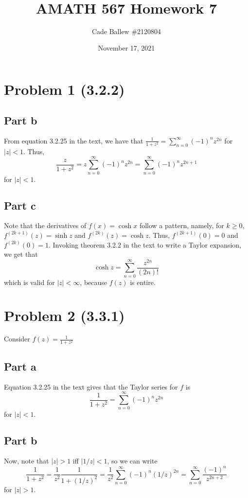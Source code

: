 \documentclass{article}
\title{AMATH 567 Homework 7}
\author{Cade Ballew \#2120804}
\date{November 17, 2021}
\begin{document}
\maketitle

\section{Problem 1 (3.2.2)}

\subsection{Part b}
From equation 3.2.25 in the text, we have that $\frac{1}{1+z^2}=\sum_{n=0}^\infty(-1)^nz^{2n}$ for $|z|<1$. Thus, 
\[
\frac{z}{1+z^2}=z\sum_{n=0}^\infty(-1)^nz^{2n}=\sum_{n=0}^\infty(-1)^nz^{2n+1}
\]
for $|z|<1$.

\subsection{Part c}
Note that the derivatives of $f(x)=\cosh{x}$ follow a pattern, namely, for $k\geq0$, $f^{(2k+1)}(z)=\sinh{z}$ and  $f^{(2k)}(z)=\cosh{z}$. Thus, $f^{(2k+1)}(0)=0$ and $f^{(2k)}(0)=1$. Invoking theorem 3.2.2 in the text to write a Taylor expansion, we get that 
\[
\cosh{z}=\sum_{n=0}^\infty\frac{z^{2n}}{(2n)!}
\]
which is valid for $|z|<\infty$, because $f(z)$ is entire.


\section{Problem 2 (3.3.1)} 
Consider $f(z)=\frac{1}{1+z^2}$
\subsection{Part a}
Equation 3.2.25 in the text gives that the Taylor series for $f$ is 
\[
\frac{1}{1+z^2}=\sum_{n=0}^\infty(-1)^nz^{2n}
\]
for $|z|<1$.

\subsection{Part b}
Now, note that $|z|>1$ iff $|1/z|<1$, so we can write 
\[
\frac{1}{1+z^2}=\frac{1}{z^2}\frac{1}{1+(1/z)^2}=\frac{1}{z^2}\sum_{n=0}^\infty(-1)^n(1/z)^{2n}=\sum_{n=0}^\infty\frac{(-1)^n}{z^{2n+2}}
\]
for $|z|>1$.
\end{document}
